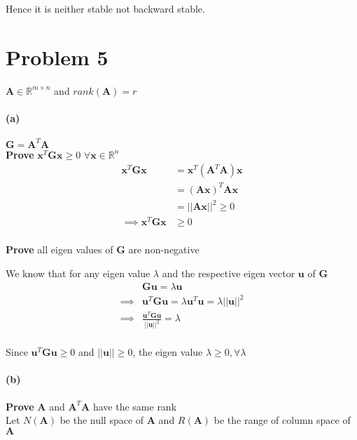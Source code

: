 \documentclass[12pt, letterpaper]{article}
\begin{document}
Hence it is neither stable not backward stable.

\pagebreak
\section*{Problem 5}
$\mathbf{A} \in \mathbb{R}^{m \times n}$ and $rank(\mathbf{A}) = r$

\paragraph{(a)} $\mathbf{G} = \mathbf{A}^T\mathbf{A}$\\

\textbf{Prove} $\mathbf{x}^T\mathbf{Gx} \geq 0$ $\forall \mathbf{x} \in \mathbb{R}^n$
\begin{align*}
  \mathbf{x}^T\mathbf{Gx} &= \mathbf{x}^T(\mathbf{A}^T\mathbf{A})\mathbf{x}\\
  &= (\mathbf{Ax})^T\mathbf{Ax}\\
  &= ||\mathbf{Ax}||^2 \geq 0\\
  \implies \mathbf{x}^T\mathbf{Gx} &\geq 0\\
\end{align*}

\textbf{Prove} all eigen values of $\mathbf{G}$ are non-negative

We know that for any eigen value $\lambda$ and the respective eigen vector $\mathbf{u}$ of $\mathbf{G}$
\begin{align*}
  &\mathbf{Gu} = \lambda\mathbf{u}\\
  \implies &\mathbf{u}^T\mathbf{Gu} = \lambda \mathbf{u}^T\mathbf{u}
  = \lambda ||\mathbf{u}||^2\\
  \implies &\frac{\mathbf{u}^T\mathbf{Gu}}{||\mathbf{u}||^2} = \lambda\\
\end{align*}

Since $\mathbf{u}^T\mathbf{Gu} \geq 0$ and $||\mathbf{u}|| \geq 0$, the eigen value $\boxed{\lambda \geq 0}, \forall \lambda$

\paragraph{(b)} \textbf{Prove} $\mathbf{A}$ and $\mathbf{A}^T\mathbf{A}$ have the same rank\\

Let $N(\mathbf{A})$ be the null space of $\mathbf{A}$ and $R(\mathbf{A})$ be the range of column space of $\mathbf{A}$\\
\end{document}
